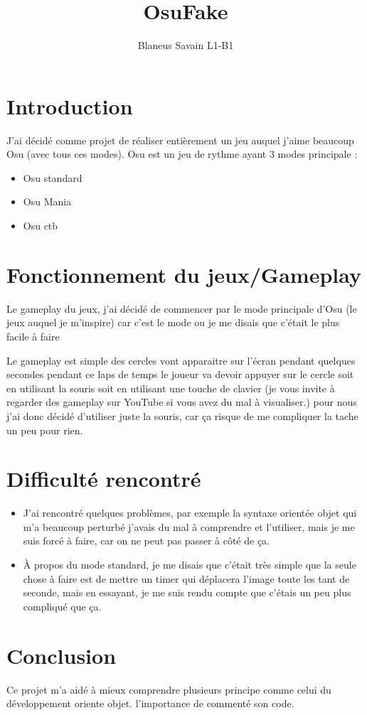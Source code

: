 \documentclass[12pt]{article}
\begin{document}
{}
\title{OsuFake}
\author{Blaneus Savain L1-B1}
\date{}
\maketitle

\tableofcontents
\section{Introduction}
J'ai décidé comme projet de réaliser entièrement un jeu auquel j'aime beaucoup Osu (avec tous ces modes). \newline 
Osu est un jeu de rythme ayant 3 modes principale :
\begin{itemize}
\item Osu standard 
\item Osu Mania
\item Osu ctb 
\end{itemize}

\vspace*{3cm}
\section{Fonctionnement du jeux/Gameplay}
\begin{center}
Le gameplay du jeux, j'ai décidé de commencer par le mode principale d'Osu (le jeux auquel je m'inspire) car c'est le mode ou je me disais que c’était le plus facile à faire 

\end{center}
Le gameplay est simple des cercles vont apparaitre sur l'écran pendant quelques secondes pendant ce laps de temps le joueur va devoir appuyer sur le cercle soit en utilisant la souris soit en utilisant une touche de clavier (je vous invite à regarder des gameplay sur YouTube si vous avez du mal à visualiser.) pour nous j'ai donc décidé d'utiliser juste la souris, car ça risque de me compliquer la tache un peu pour rien. 


\section{Difficulté rencontré}
\begin{itemize}
\item J'ai rencontré quelques problèmes, par exemple la syntaxe orientée objet qui m'a beaucoup perturbé j'avais du mal à comprendre et l'utiliser, mais je me suis forcé à faire, car on ne peut pas passer à côté de ça.
\item À propos du mode standard, je me disais que c'était très simple que la seule chose à faire est de mettre un timer qui déplacera l'image toute les tant de seconde, mais en essayant, je me suis rendu compte que c'étais un peu plus compliqué que ça.
\end{itemize} 
\section{Conclusion}
Ce projet m'a aidé à mieux comprendre plusieurs principe comme celui du développement oriente objet.
l'importance de commenté son code.
\end{document}
